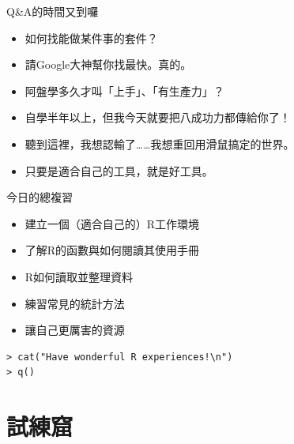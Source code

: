 \documentclass[14pt, aspectratio=43]{beamer}
\begin{document}
\begin{frame}[fragile]{Q\&A的時間又到囉}
\begin{itemize}
\item[Q] 如何找能做某件事的套件？
\item[A] 請Google大神幫你找最快。真的。
\end{itemize}
\begin{itemize}
\item[Q] 阿盤學多久才叫「上手」、「有生產力」？
\item[A] 自學半年以上，但我今天就要把八成功力都傳給你了！
\end{itemize}
\begin{itemize}\item[Q] 聽到這裡，我想認輸了……我想重回用滑鼠搞定的世界。
\item[A] 只要是適合自己的工具，就是好工具。
\end{itemize}
\end{frame}

\begin{frame}[fragile]{今日的總複習}
\begin{itemize}
\item 建立一個（適合自己的）R工作環境
\item 了解R的函數與如何閱讀其使用手冊
\item R如何讀取並整理資料
\item 練習常見的統計方法
\item 讓自己更厲害的資源
\end{itemize}

\large
\begin{verbatim}
> cat("Have wonderful R experiences!\n")
> q()
\end{verbatim}

\end{frame}



\section{試練窟}\subsection{}
\end{document}
